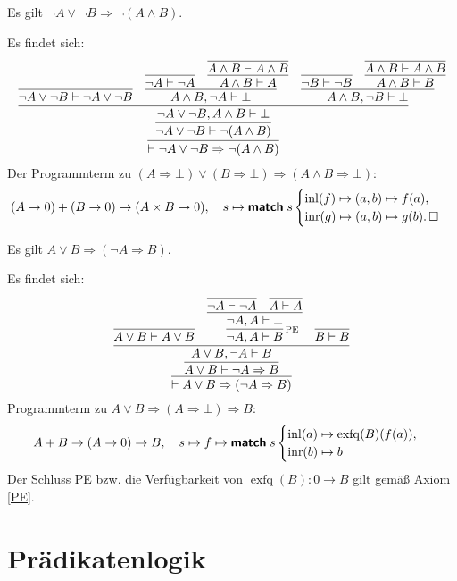 \begin{Satz}
Es gilt $\neg A\lor\neg B\Rightarrow\neg (A\land B)$.
\end{Satz}
\begin{Beweis}
Es findet sich:
\[
\infer{\vdash\neg A\lor\neg B\Rightarrow\neg (A\land B)}{
  \infer{\neg A\lor\neg B\vdash\neg (A\land B)}{
    \infer{\neg A\lor\neg B, A\land B\vdash\bot}{
      \infer{\neg A\lor\neg B\vdash\neg A\lor\neg B}{}
    & \infer{A\land B,\neg A\vdash\bot}{
        \infer{\neg A\vdash\neg A}{}
      & \infer{A\land B\vdash A}{\infer{A\land B\vdash A\land B}{}}}
    & \infer{A\land B,\neg B\vdash\bot}{
        \infer{\neg B\vdash\neg B}{}
      & \infer{A\land B\vdash B}{\infer{A\land B\vdash A\land B}{}}}}}}
\]
Der Programmterm zu
$(A\Rightarrow\bot)\lor(B\Rightarrow\bot)\Rightarrow (A\land B\Rightarrow\bot)$:
\[(A\to 0)+(B\to 0)\to (A\times B\to 0),\quad
s\mapsto\text{{\normalfont\sffamily\bfseries match}}\; s\begin{cases}
\operatorname{inl}(f)\mapsto (a,b)\mapsto f(a),\\
\operatorname{inr}(g)\mapsto (a,b)\mapsto g(b).\,\square
\end{cases}\]
\end{Beweis}

\begin{Satz}
Es gilt $A\lor B\Rightarrow (\neg A\Rightarrow B)$.
\end{Satz}
\begin{Beweis}
Es findet sich:
\[
\infer{\vdash A\lor B\Rightarrow (\neg A\Rightarrow B)}{
  \infer{A\lor B\vdash \neg A\Rightarrow B}{
    \infer{A\lor B, \neg A\vdash B}{
      \infer{A\lor B\vdash A\lor B}{}
    & \infer[\infernote{PE}]{\neg A, A\vdash B}{
        \infer{\neg A, A\vdash\bot}{
          \infer{\neg A\vdash\neg A}{}
        & \infer{A\vdash A}{}}}
    & \infer{B\vdash B}{}}}}
\]
Programmterm zu $A\lor B\Rightarrow (A\Rightarrow\bot)\Rightarrow B$:
\[A+B\to (A\to 0)\to B,\quad s\mapsto f\mapsto\text{{\normalfont\sffamily\bfseries match}}\; s\begin{cases}
\operatorname{inl}(a)\mapsto \operatorname{exfq}(B)(f(a)),\\
\operatorname{inr}(b)\mapsto b
\end{cases}\]
Der Schluss PE bzw. die Verfügbarkeit von
$\operatorname{exfq}(B)\colon 0\to B$
gilt gemäß Axiom \ref{PE}.\,\qedsymbol
\end{Beweis}

\newpage
\section{Prädikatenlogik}

